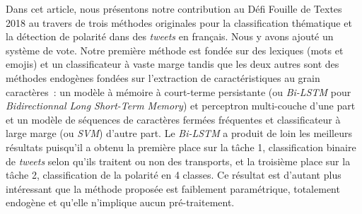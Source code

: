 
 Dans cet article, nous présentons notre contribution au Défi Fouille de Textes 2018 au travers de trois méthodes originales pour la classification thématique et la détection de polarité dans des \textit{tweets} en français. Nous y avons ajouté un système de vote.
 Notre première méthode est fondée sur des lexiques (mots et emojis) et un classificateur à vaste marge
 tandis que les deux autres sont des méthodes endogènes fondées sur l'extraction de caractéristiques au grain caractères~: un modèle à mémoire à court-terme persistante (ou \textit{Bi-LSTM} pour \textit{Bidirectionnal Long Short-Term Memory}) et perceptron multi-couche d'une part et un modèle de séquences de caractères fermées fréquentes et classificateur à large marge (ou \textit{SVM}) d'autre part.
 Le \textit{Bi-LSTM} a produit de loin les meilleurs résultats puisqu'il a obtenu la première place sur la tâche 1, classification binaire de \textit{tweets} selon qu'ils traitent ou non des transports, et la troisième place sur la tâche 2, classification de la polarité en 4 classes.
 Ce résultat est d'autant plus intéressant que la méthode proposée est faiblement paramétrique, totalement endogène et qu'elle n'implique aucun pré-traitement.

